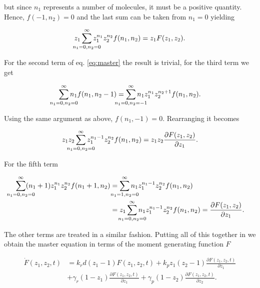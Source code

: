but since $n_1$ represents a number of molecules, it must be a positive quantity. Hence, $f(-1,n_2)=0$ and the last sum can be taken from $n_1=0$ yielding

\begin{equation*}
  z_1 \sum_{\mathclap{n_1=0,n_2=0}}^\infty z_1^{n_1}z_2^{n_2}f(n_1,n_2) = z_1F(z_1,z_2).
\end{equation*}

For the second term of eq. \eqref{eq:master} the result is trivial, for the third term we get

\begin{equation*}
  \sum_{\mathclap{n_1=0,n_2=0}}^\infty n_1f(n_1,n_2-1) = \sum_{\mathclap{n_1=0,n_2=-1}}^\infty n_1z_1^{n_1}z_2^{n_2+1}f(n_1,n_2).
\end{equation*}

Using the same argument as above, $f(n_1,-1) = 0$. Rearranging it becomes

\begin{equation*}
  z_1 z_2 \sum_{\mathclap{n_1=0,n_2=0}}^\infty z_1^{n_1-1}z_2^{n_2}f(n_1,n_2) = z_1 z_2 \frac{\partial F(z_1,z_2)}{\partial z_1}.
\end{equation*}

For the fifth term

\begin{equation*}
  \begin{split}
    \sum_{\mathclap{n_1=0,n_2=0}}^\infty (n_1+1)z_1^{n_1}z_2^{n_2}f(n_1+1,n_2) &= \sum_{\mathclap{n_1=1,n_2=0}}^\infty n_1z_1^{n_1-1}z_2^{n_2}f(n_1,n_2)\\ 
    &= z_1 \sum_{\mathclap{n_1=0,n_2=0}}^\infty n_1z_1^{n_1-1}z_2^{n_2}f(n_1,n_2) = \frac{\partial F(z_1,z_2)}{\partial z_1}.
  \end{split}
\end{equation*}

The other terms are treated in a similar fashion. Putting all of this together in we obtain the master equation in terms of the moment generating function $F$

\begin{equation}
  \label{eq:masterF}
  \begin{split}
    \dot{F}(z_1,z_2,t) &= k_rd(z_1-1)F(z_1,z_2,t) + k_pz_1(z_2-1)\frac{\partial F(z_1,z_2,t)}{\partial z_1} \\
    &+ \gamma_r(1-z_1)\frac{\partial F(z_1,z_2,t)}{\partial z_1} + \gamma_p(1-z_2)\frac{\partial F(z_1,z_2,t)}{\partial z_2}.
  \end{split}
\end{equation}


